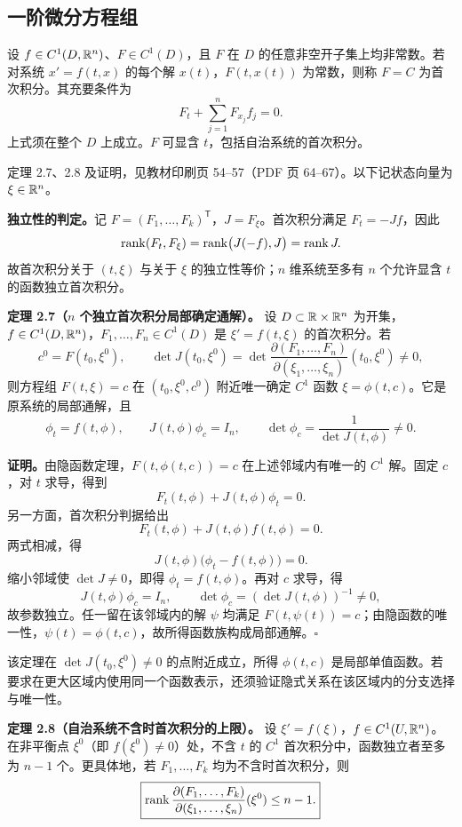 \subsection{一阶微分方程组}
设 $f\in C^1(D,\mathbb R^n)$、$F\in C^1(D)$，且 $F$ 在 $D$ 的任意非空开子集上均非常数。若对系统 $x'=f(t,x)$ 的每个解 $x(t)$，$F(t,x(t))$ 为常数，则称 $F=C$ 为首次积分。其充要条件为
\[
\boxed{F_t+\sum_{j=1}^n F_{x_j}f_j=0.}
\]
上式须在整个 $D$ 上成立。$F$ 可显含 $t$，包括自治系统的首次积分。

\core 定理 2.7、2.8 及证明，见教材印刷页 54--57（PDF 页 64--67）。以下记状态向量为 $\xi\in\mathbb R^n$。

\textbf{独立性的判定。}记 $F=(F_1,\ldots,F_k)^{\mathsf T}$，$J=F_\xi$。首次积分满足 $F_t=-Jf$，因此
\[
\operatorname{rank}(F_t,F_\xi)=\operatorname{rank}\bigl(J(-f),J\bigr)=\operatorname{rank} J.
\]
故首次积分关于 $(t,\xi)$ 与关于 $\xi$ 的独立性等价；$n$ 维系统至多有 $n$ 个允许显含 $t$ 的函数独立首次积分。

\textbf{定理 2.7（$n$ 个独立首次积分局部确定通解）。}
设 $D\subset\mathbb R\times\mathbb R^n$ 为开集，$f\in C^1(D,\mathbb R^n)$，$F_1,\ldots,F_n\in C^1(D)$ 是 $\xi'=f(t,\xi)$ 的首次积分。若
\[
c^0=F(t_0,\xi^0),\qquad
\det J(t_0,\xi^0)=\det\frac{\partial(F_1,\ldots,F_n)}{\partial(\xi_1,\ldots,\xi_n)}(t_0,\xi^0)\ne0,
\]
则方程组 $F(t,\xi)=c$ 在 $(t_0,\xi^0,c^0)$ 附近唯一确定 $C^1$ 函数 $\xi=\phi(t,c)$。它是原系统的局部通解，且
\[
\phi_t=f(t,\phi),\qquad J(t,\phi)\phi_c=I_n,
\qquad \boxed{\det\phi_c=\frac1{\det J(t,\phi)}\ne0.}
\]

\textbf{证明。}由隐函数定理，$F(t,\phi(t,c))=c$ 在上述邻域内有唯一的 $C^1$ 解。固定 $c$，对 $t$ 求导，得到
\[
F_t(t,\phi)+J(t,\phi)\phi_t=0.
\]
另一方面，首次积分判据给出
\[
F_t(t,\phi)+J(t,\phi)f(t,\phi)=0.
\]
两式相减，得
\[
J(t,\phi)\bigl(\phi_t-f(t,\phi)\bigr)=0.
\]
缩小邻域使 $\det J\ne0$，即得 $\phi_t=f(t,\phi)$。再对 $c$ 求导，得
\[
J(t,\phi)\phi_c=I_n,\qquad \det\phi_c=(\det J(t,\phi))^{-1}\ne0,
\]
故参数独立。任一留在该邻域内的解 $\psi$ 均满足 $F(t,\psi(t))=c$；由隐函数的唯一性，$\psi(t)=\phi(t,c)$，故所得函数族构成局部通解。\hfill$\square$

该定理在 $\det J(t_0,\xi^0)\ne0$ 的点附近成立，所得 $\phi(t,c)$ 是局部单值函数。若要求在更大区域内使用同一个函数表示，还须验证隐式关系在该区域内的分支选择与唯一性。

\textbf{定理 2.8（自治系统不含时首次积分的上限）。}
设 $\xi'=f(\xi)$，$f\in C^1(U,\mathbb R^n)$。在非平衡点 $\xi^0$（即 $f(\xi^0)\ne0$）处，不含 $t$ 的 $C^1$ 首次积分中，函数独立者至多为 $n-1$ 个。更具体地，若 $F_1,\ldots,F_k$ 均为不含时首次积分，则
\[
\boxed{\operatorname{rank}\frac{\partial(F_1,\ldots,F_k)}{\partial(\xi_1,\ldots,\xi_n)}(\xi^0)\le n-1.}
\]

